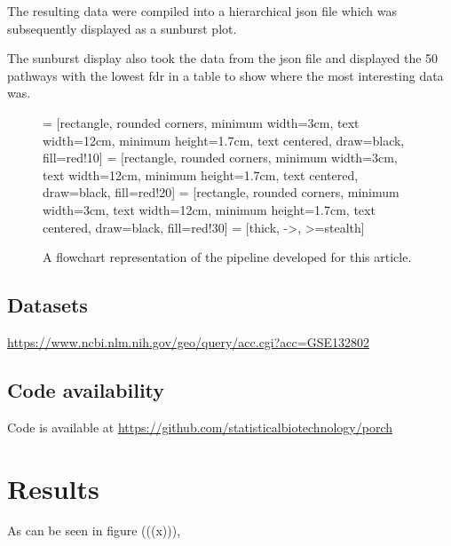 \documentclass[11pt]{article}
\begin{document}
  The resulting data were compiled into a hierarchical json file which was subsequently displayed as a sunburst plot.

  The sunburst display also took the data from the json file and displayed the 50 pathways with the lowest fdr in a table to show where the most interesting data was.

  \begin{figure}[t]
    \centering
     = [rectangle, rounded corners, minimum width=3cm, text width=12cm, minimum height=1.7cm, text centered, draw=black, fill=red!10]
     = [rectangle, rounded corners, minimum width=3cm, text width=12cm, minimum height=1.7cm, text centered, draw=black, fill=red!20]
     = [rectangle, rounded corners, minimum width=3cm, text width=12cm, minimum height=1.7cm, text centered, draw=black, fill=red!30]
     = [thick, ->, >=stealth]

  \caption{ A flowchart representation of the pipeline developed for this article.}
  \label{Pipeline flowchart}
\end{figure}

\subsection*{Datasets}
  \url{https://www.ncbi.nlm.nih.gov/geo/query/acc.cgi?acc=GSE132802}
\subsection*{Code availability}
  Code is available at \url{https://github.com/statisticalbiotechnology/porch}

\section*{Results}


  As can be seen in figure (((x))),
\end{document}
